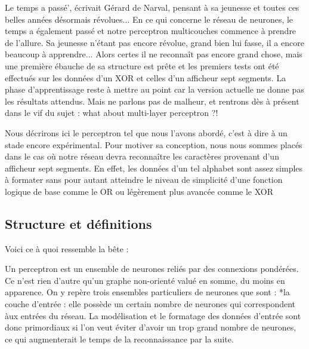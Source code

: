 \documentclass[a4paper,10pt]{report}
\begin{document}
Le temps a pass\'e', \'ecrivait G\'erard de Narval, pensant \`a sa jeunesse
et toutes ces belles ann\'ees d\'esormais r\'evolues... En ce qui
concerne le r\'eseau de neurones, le temps a \'egalement pass\'e et
notre perceptron multicouches commence \`a prendre de l'allure. Sa
jeunesse n'\'etant pas encore r\'evolue, grand bien lui fasse, il a
encore beaucoup \`a apprendre... Alors
certes il ne reconna\^it pas encore grand chose, mais une premi\`ere
\'ebauche de sa structure est pr\^ete et les premiers tests ont \'et\'e
effectu\'es sur les donn\'ees d'un XOR et celles d'un afficheur sept
segments. La phase d'apprentissage reste \`a mettre au point car la
version actuelle ne donne pas les r\'esultats attendus. Mais ne parlons
pas de malheur, et rentrons d\`es \`a pr\'esent dans le vif du sujet : what about
multi-layer perceptron ?! 

Nous d\'ecrirons ici le perceptron tel que nous l'avons abord\'e, c'est \`a
dire \`a un stade encore exp\'erimental. Pour motiver sa conception,
nous nous sommes plac\'es dans le cas o\`u notre r\'eseau devra
reconna\^itre les caract\`eres provenant d'un afficheur sept
segments. En effet, les donn\'ees d'un tel alphabet sont assez simples
\`a formater sans pour autant atteindre le niveau de simplicit\'e d'une
fonction logique de base comme le OR ou l\'eg\`erement plus avanc\'ee
comme le XOR


\subsection{Structure et d\'efinitions} %
\label{sec:structure_et_definitions}

Voici ce \`a quoi ressemble la b\^ete :

Un perceptron est un ensemble de neurones reli\'es par des connexions
pond\'er\'ees. Ce n'est rien d'autre qu'un graphe non-orient\'e valu\'e
en somme, du moins en apparence. On y rep\`ere trois ensembles
particuliers de neurones que sont : 
*la couche d'entr\'ee : elle poss\`ede un certain nombre de neurones qui
correspondent \`aux entr\'ees du r\'eseau. La mod\'elisation et le
formatage des donn\'ees d'entr\'ee sont donc primordiaux si l'on veut
\'eviter d'avoir un trop grand nombre de neurones, ce qui augmenterait
le temps de la reconnaissance par la suite.
\end{document}
